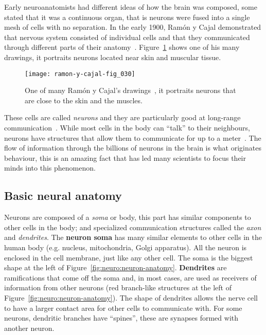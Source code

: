 Early neuroanatomists had different ideas of how the brain was composed, some stated that it was a continuous organ, that is neurons were fused into a single mesh of cells with no separation. In the early 1900, Ramón y Cajal demonstrated that nervous system consisted of individual cells and that they communicated through different parts of their anatomy~\cite{Nemri:2010}. Figure~\ref{fig:neuro:ramon-y-cajal-neuro} shows one of his many drawings, it portraits neurons located near skin and muscular tissue.

\begin{figure}[hbt]
  \begin{center}
    \texttt{[image: ramon-y-cajal-fig\_030]}
    \caption{One of many Ramón y Cajal's drawings~\cite{cervantes-images}, it portraits neurons that are close to the skin and the muscles.}
    \label{fig:neuro:ramon-y-cajal-neuro}
  \end{center}
\end{figure}

These cells are called \emph{neurons} and they are particularly good at  long-range communication~\cite{thompson2000brain}. While most cells in the body can ``talk'' to their neighbours, neurons have structures that allow them to communicate for up to a meter~\cite{eye-brain-vision-hubel1995}. The flow of information through the billions of neurons in the brain is what originates behaviour, this is an amazing fact that has led many scientists to focus their minds into this phenomenon.

\subsection{Basic neural anatomy}

Neurons are composed of a \emph{soma} or body, this part has similar components to other cells in the body; and specialized communication structures called the \emph{axon} and \emph{dendrites}. The \textbf{neuron soma} has many similar elements to other cells in the human body (e.g. nucleus, mitochondria, Golgi apparatus). All the neuron is enclosed in the cell membrane, just like any other cell. The soma is the biggest shape at the left of Figure~\ref{fig:neuro:neuron-anatomy}. \textbf{Dendrites} are ramifications that come off the soma and, in most cases, are used as receivers of information from other neurons (red branch-like structures at the left of Figure~\ref{fig:neuro:neuron-anatomy}). The shape of dendrites allows the nerve cell to have a larger contact area for other cells to communicate with. For some neurons, dendritic branches have ``spines'', these are synapses formed with another neuron.

